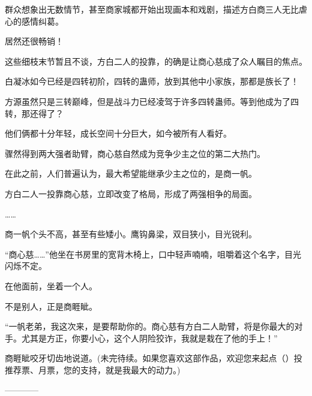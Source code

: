 \begin{this_body}
群众想象出无数情节，甚至商家城都开始出现画本和戏剧，描述方白商三人无比虐心的感情纠葛。

居然还很畅销！

这些细枝末节暂且不谈，方白二人的投靠，的确是让商心慈成了众人瞩目的焦点。

白凝冰如今已经是四转初阶，四转的蛊师，放到其他中小家族，那都是族长了！

方源虽然只是三转巅峰，但是战斗力已经凌驾于许多四转蛊师。等到他成为了四转，那还得了？

他们俩都十分年轻，成长空间十分巨大，如今被所有人看好。

骤然得到两大强者助臂，商心慈自然成为竞争少主之位的第二大热门。

在此之前，人们普遍认为，最大希望能继承少主之位的，是商一帆。

方白二人一投靠商心慈，立即改变了格局，形成了两强相争的局面。

……

商一帆个头不高，甚至有些矮小。鹰钩鼻梁，双目狭小，目光锐利。

“商心慈……”他坐在书房里的宽背木椅上，口中轻声喃喃，咀嚼着这个名字，目光闪烁不定。

在他面前，坐着一个人。

不是别人，正是商睚眦。

“一帆老弟，我这次来，是要帮助你的。商心慈有方白二人助臂，将是你最大的对手。尤其是方正，你要小心，这个人阴险狡诈，我就是栽在了他的手上！”

商睚眦咬牙切齿地说道。(未完待续。如果您喜欢这部作品，欢迎您来起点（）投推荐票、月票，您的支持，就是我最大的动力。)

------------

\end{this_body}

